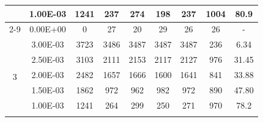 \begin{table}[H]
{\begin{tabular}{|c|c|c|c|c|c|c|c|c|}
                               & 1.00E-03         & 1241      & 237                                                        & 274                                                       & 198                                                       & 237     & 1004   & 80.9                                                               \\ \cline{2-9}
                               & 0.00E+00         & 0         & 27                                                         & 20                                                        & 29                                                        & 26      & 26     & -                                                                  \\ \hline
            \multirow{6}{*}{3} & 3.00E-03         & 3723      & 3486                                                       & 3487                                                      & 3487                                                      & 3487    & 236    & 6.34                                                               \\ \cline{2-9}
                               & 2.50E-03         & 3103      & 2111                                                       & 2153                                                      & 2117                                                      & 2127    & 976    & 31.45                                                              \\ \cline{2-9}
                               & 2.00E-03         & 2482      & 1657                                                       & 1666                                                      & 1600                                                      & 1641    & 841    & 33.88                                                              \\ \cline{2-9}
                               & 1.50E-03         & 1862      & 972                                                        & 962                                                       & 982                                                       & 972     & 890    & 47.80                                                              \\ \cline{2-9}
                               & 1.00E-03         & 1241      & 264                                                        & 299                                                       & 250                                                       & 271     & 970    & 78.2                                                               \\ \cline{2-9}

\end{tabular}}
\end{table}
